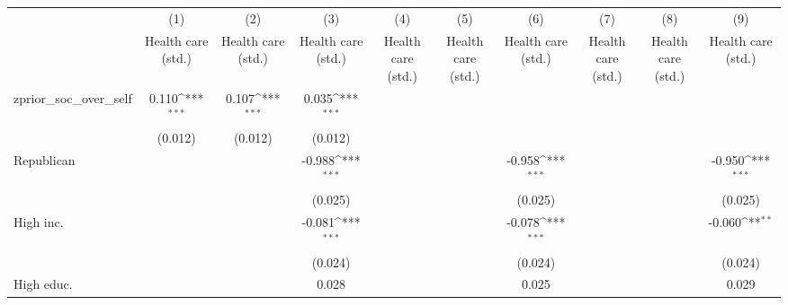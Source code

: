 {
\def\sym#1{\ifmmode^{#1}\else\(^{#1}\)\fi}
\begin{tabular}{l*{9}{c}}
\toprule
                    &\multicolumn{1}{c}{(1)}&\multicolumn{1}{c}{(2)}&\multicolumn{1}{c}{(3)}&\multicolumn{1}{c}{(4)}&\multicolumn{1}{c}{(5)}&\multicolumn{1}{c}{(6)}&\multicolumn{1}{c}{(7)}&\multicolumn{1}{c}{(8)}&\multicolumn{1}{c}{(9)}\\
                    &\multicolumn{1}{c}{Health care (std.)}&\multicolumn{1}{c}{Health care (std.)}&\multicolumn{1}{c}{Health care (std.)}&\multicolumn{1}{c}{Health care (std.)}&\multicolumn{1}{c}{Health care (std.)}&\multicolumn{1}{c}{Health care (std.)}&\multicolumn{1}{c}{Health care (std.)}&\multicolumn{1}{c}{Health care (std.)}&\multicolumn{1}{c}{Health care (std.)}\\
\midrule
zprior\_soc\_over\_self&       0.110\sym{***}&       0.107\sym{***}&       0.035\sym{***}&                     &                     &                     &                     &                     &                     \\
                    &     (0.012)         &     (0.012)         &     (0.012)         &                     &                     &                     &                     &                     &                     \\
\addlinespace
Republican          &                     &                     &      -0.988\sym{***}&                     &                     &      -0.958\sym{***}&                     &                     &      -0.950\sym{***}\\
                    &                     &                     &     (0.025)         &                     &                     &     (0.025)         &                     &                     &     (0.025)         \\
\addlinespace
High inc.           &                     &                     &      -0.081\sym{***}&                     &                     &      -0.078\sym{***}&                     &                     &      -0.060\sym{**} \\
                    &                     &                     &     (0.024)         &                     &                     &     (0.024)         &                     &                     &     (0.024)         \\
\addlinespace
High educ.          &                     &                     &       0.028         &                     &                     &       0.025         &                     &                     &       0.029         \\

\end{tabular}}

